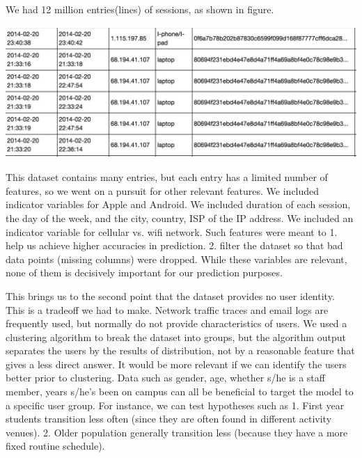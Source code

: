 \documentclass[]{article}
\newenvironment{Figure}
  {\par\medskip\noindent\minipage{\linewidth}}
  {\endminipage\par\medskip}
\begin{document}
We had 12 million entries(lines) of sessions, as shown in figure.

\begin{Figure}
 \centering
 \includegraphics[height = 5cm, width =15cm]{dataSample.png}
\end{Figure}

This dataset contains many entries, but each entry has a limited number of features, so we went on a pursuit for other relevant features. We included indicator variables for Apple and Android. We included duration of each session, the day of the week, and the city, country, ISP of the IP address. We included an indicator variable for cellular vs. wifi network. Such features were meant to 1. help us achieve higher accuracies in prediction. 2. filter the dataset so that bad data points (missing columns) were dropped. While these variables are relevant, none of them is decisively important for our prediction purposes.

This brings us to the second point that the dataset provides no user identity. This is a tradeoff we had to make. Network traffic traces and email logs are frequently used, but normally do not provide characteristics of users. We used a clustering algorithm to break the dataset into groups, but the algorithm output separates the users by the results of distribution, not by a reasonable feature that gives a less direct answer. It would be more relevant if we can identify the users better prior to clustering. Data such as gender, age, whether s/he is a staff member, years s/he's been on campus can all be beneficial to target the model to a specific user group. For instance, we can test hypotheses such as 1. First year students transition less often (since they are often found in different activity venues). 2. Older population generally transition less (because they have a more fixed routine schedule).
\end{document}
